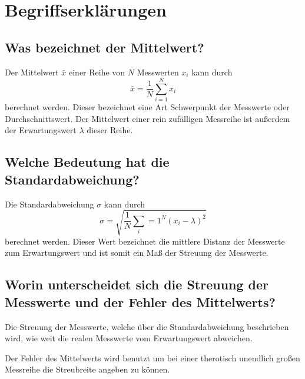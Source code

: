 \section{Begriffserklärungen}
\label{sec:Begriffe}

\subsection{Was bezeichnet der Mittelwert?}
\label{ssec:Mittelwert}

Der Mittelwert $\bar{x}$ einer Reihe von $N$ Messwerten $x_i$ kann durch
\begin{equation}
    \bar{x} = \frac{1}{N} \sum_{i=1}^N x_i 
\end{equation}
berechnet werden. Dieser bezeichnet eine Art Schwerpunkt der Messwerte oder Durchschnittswert. Der Mittelwert einer rein zufälligen Messreihe ist außerdem der Erwartungswert $\lambda$ dieser Reihe.

\subsection{Welche Bedeutung hat die Standardabweichung?}
\label{ssec:Standardabweichung}

Die Standardabweichung $\sigma$ kann durch
\begin{equation}
    \sigma = \sqrt{\frac{1}{N} \sum_i=1^N (x_i - \lambda)^2}
\end{equation}
berechnet werden. Dieser Wert bezeichnet die mittlere Distanz der Messwerte zum Erwartungswert und ist somit ein Maß der Streuung der Messwerte.

\subsection{Worin unterscheidet sich die Streuung der Messwerte und der Fehler des Mittelwerts?}
\label{ssec:Streuung-Fehler}

Die Streuung der Messwerte, welche über die Standardabweichung beschrieben wird, wie weit die realen Messwerte vom Erwartungswert abweichen.

Der Fehler des Mittelwerts wird benutzt um bei einer therotisch unendlich großen Messreihe die Streubreite angeben zu können.